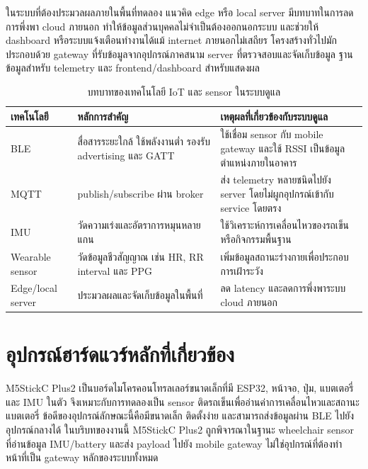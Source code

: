 ในระบบที่ต้องประมวลผลภายในพื้นที่ทดลอง แนวคิด edge หรือ local server มีบทบาทในการลดการพึ่งพา cloud ภายนอก ทำให้ข้อมูลส่วนบุคคลไม่จำเป็นต้องออกนอกระบบ และช่วยให้ dashboard หรือระบบแจ้งเตือนทำงานได้แม้ internet ภายนอกไม่เสถียร โครงสร้างทั่วไปมักประกอบด้วย gateway ที่รับข้อมูลจากอุปกรณ์ภาคสนาม server ที่ตรวจสอบและจัดเก็บข้อมูล ฐานข้อมูลสำหรับ telemetry และ frontend/dashboard สำหรับแสดงผล

\begin{table}[htbp]
    \centering
    \caption{บทบาทของเทคโนโลยี IoT และ sensor ในระบบดูแล}
    \label{tab:ch2_iot_sensor_roles}
    \small
    \begin{tabular}{>{\raggedright\arraybackslash}p{}
                    >{\raggedright\arraybackslash}p{}
                    >{\raggedright\arraybackslash}p{}}
        \toprule
        เทคโนโลยี & หลักการสำคัญ & เหตุผลที่เกี่ยวข้องกับระบบดูแล \\ \midrule
        BLE & สื่อสารระยะใกล้ ใช้พลังงานต่ำ รองรับ advertising และ GATT & ใช้เชื่อม sensor กับ mobile gateway และใช้ RSSI เป็นข้อมูลตำแหน่งภายในอาคาร \\ \midrule
        MQTT & publish/subscribe ผ่าน broker & ส่ง telemetry หลายชนิดไปยัง server โดยไม่ผูกอุปกรณ์เข้ากับ service โดยตรง \\ \midrule
        IMU & วัดความเร่งและอัตราการหมุนหลายแกน & ใช้วิเคราะห์การเคลื่อนไหวของรถเข็นหรือกิจกรรมพื้นฐาน \\ \midrule
        Wearable sensor & วัดข้อมูลชีวสัญญาณ เช่น HR, RR interval และ PPG & เพิ่มข้อมูลสถานะร่างกายเพื่อประกอบการเฝ้าระวัง \\ \midrule
        Edge/local server & ประมวลผลและจัดเก็บข้อมูลในพื้นที่ & ลด latency และลดการพึ่งพาระบบ cloud ภายนอก \\ \bottomrule
    \end{tabular}
\end{table}

\section{อุปกรณ์ฮาร์ดแวร์หลักที่เกี่ยวข้อง}
\label{sec:ch2_hardware}

M5StickC Plus2 เป็นบอร์ดไมโครคอนโทรลเลอร์ขนาดเล็กที่มี ESP32, หน้าจอ, ปุ่ม, แบตเตอรี่ และ IMU ในตัว จึงเหมาะกับการทดลองเป็น sensor ติดรถเข็นเพื่ออ่านค่าการเคลื่อนไหวและสถานะแบตเตอรี่ ข้อดีของอุปกรณ์ลักษณะนี้คือมีขนาดเล็ก ติดตั้งง่าย และสามารถส่งข้อมูลผ่าน BLE ไปยังอุปกรณ์กลางได้ ในบริบทของงานนี้ M5StickC Plus2 ถูกพิจารณาในฐานะ wheelchair sensor ที่อ่านข้อมูล IMU/battery และส่ง payload ไปยัง mobile gateway ไม่ใช่อุปกรณ์ที่ต้องทำหน้าที่เป็น gateway หลักของระบบทั้งหมด \cite{M5StickCPlus2Docs}


